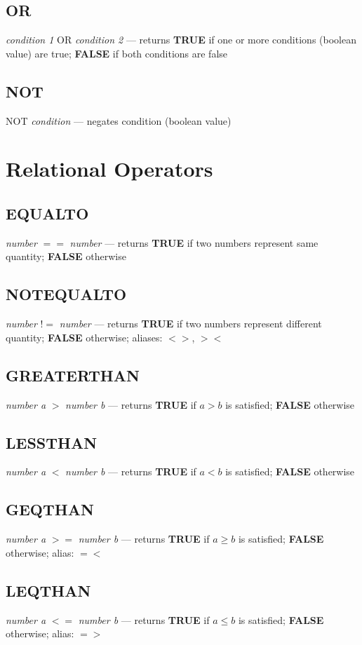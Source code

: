 \subsection{OR} \emph{condition 1} OR \emph{condition 2} --- returns \textbf{TRUE} if one or more conditions (boolean value) are true; \textbf{FALSE} if both conditions are false
\subsection{NOT} NOT \emph{condition} --- negates condition (boolean value)


\section{Relational Operators}

\subsection{EQUALTO} \emph{number} $=$$=$ \emph{number} --- returns \textbf{TRUE} if two numbers represent same quantity; \textbf{FALSE} otherwise
\subsection{NOTEQUALTO} \emph{number} !$=$ \emph{number} --- returns \textbf{TRUE} if two numbers represent different quantity; \textbf{FALSE} otherwise; aliases: $<$$>$, $>$$<$
\subsection{GREATERTHAN} \emph{number a} $>$ \emph{number b} --- returns \textbf{TRUE} if $a > b$ is satisfied; \textbf{FALSE} otherwise
\subsection{LESSTHAN} \emph{number a} $<$ \emph{number b} --- returns \textbf{TRUE} if $a < b$ is satisfied; \textbf{FALSE} otherwise
\subsection{GEQTHAN} \emph{number a} $>$$=$ \emph{number b} --- returns \textbf{TRUE} if $a \geq b$ is satisfied; \textbf{FALSE} otherwise; alias: $=$$<$
\subsection{LEQTHAN} \emph{number a} $<$$=$ \emph{number b} --- returns \textbf{TRUE} if $a \leq b$ is satisfied; \textbf{FALSE} otherwise; alias: $=$$>$


